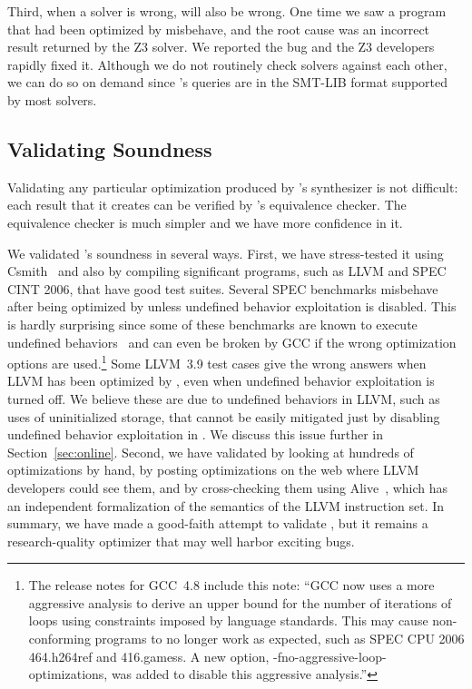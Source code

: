 Third, when a solver is wrong, \tool{} will also be wrong.
%
One time we saw a program that had been optimized by \tool{}
misbehave, and the root cause was an incorrect result returned by the
Z3 solver.
%
We reported the bug and the Z3 developers rapidly fixed it.
%
Although we do not routinely check solvers against each other, we can
do so on demand since \tool's queries are in the SMT-LIB format
supported by most solvers.


\subsection{Validating Soundness}
\label{sec:validate}

Validating any particular optimization produced by \tool's synthesizer
is not difficult: each result that it creates can be verified by
\tool{}'s equivalence checker.
%
The equivalence checker is much simpler and we have more confidence in
it.


We validated \tool{}'s soundness in several ways.
%
First, we have stress-tested it using Csmith~\cite{Yang11} and also by
compiling significant programs, such as LLVM and SPEC CINT 2006,
that have good test suites.
%
Several SPEC benchmarks misbehave after being optimized by \tool{}
unless undefined behavior exploitation is disabled.
%
This is hardly surprising since some of these benchmarks are known to
execute undefined behaviors~\cite{Dietz15} and can even be broken by
GCC if the wrong optimization options are used.\footnote{The release
  notes for GCC~4.8 include this note: ``GCC now uses a more
  aggressive analysis to derive an upper bound for the number of
  iterations of loops using constraints imposed by language
  standards. This may cause non-conforming programs to no longer work
  as expected, such as SPEC CPU 2006 464.h264ref and 416.gamess. A new
  option, -fno-aggressive-loop-optimizations, was added to disable
  this aggressive analysis.''}
%
Some LLVM~3.9 test cases give the wrong answers when LLVM has been
optimized by \tool{}, even when undefined behavior exploitation is
turned off.
%
We believe these are due to undefined behaviors in LLVM, such as uses
of uninitialized storage, that cannot be easily mitigated just by
disabling undefined behavior exploitation in \tool{}.
%
We discuss this issue further in Section~\ref{sec:online}.
%
Second, we have validated \tool{} by looking at hundreds of
optimizations by hand, by posting optimizations on the web where LLVM
developers could see them, and by cross-checking them using
Alive~\cite{Lopes15}, which has an independent formalization of the
semantics of the LLVM instruction set.
%
In summary, we have made a good-faith attempt to validate \tool, but
it remains a research-quality optimizer that may well harbor exciting
bugs.


